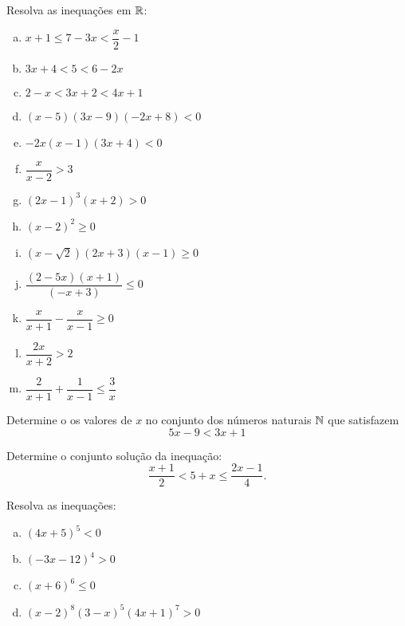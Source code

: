 \begin{secExercicios}

\begin{exer}
   Resolva as inequações em $\mathbb{R}$:
    \begin{enumerate}[a)]
        \item $x + 1 \leq 7 - 3x < \dfrac{x}{2}-1$
        \item $3x+4 < 5 < 6-2x$
        \item $2-x<3x+2<4x+1$
        \item $(x-5)(3x-9)(-2x+8)<0$
        \item $-2x(x-1)(3x+4)<0$
        \item $\dfrac{x}{x-2}>3$
        \item $(2x-1)^3(x+2)>0$
        \item $(x-2)^2 \geq 0$
        \item $(x-\sqrt{2})(2x+3)(x-1)\geq0$
        \item $\dfrac{(2-5x)(x+1)}{(-x+3)}\leq 0$
        \item $\dfrac{x}{x+1} - \dfrac{x}{x-1} \geq 0$
        \item $\dfrac{2x}{x+2} > 2$
        \item $\dfrac{2}{x+1} + \dfrac{1}{x-1} \leq \dfrac{3}{x}$
    \end{enumerate}
\end{exer}

\begin{exer}
    Determine o os valores de $x$ no conjunto dos números naturais $\mathbb{N}$ que satisfazem
    \begin{equation*}
        5x-9<3x+1
    \end{equation*}
\end{exer}


\begin{exer}
    Determine o conjunto solução da inequação:
    \begin{equation*}
        \frac{x+1}{2}<5+x\leq \frac{2x-1}{4}.
    \end{equation*}
\end{exer}

\begin{exer}
    Resolva as inequações:
    \begin{enumerate}[a)]
        \item $(4x+5)^5<0$
        \item $(-3x-12)^4>0$
        \item $(x+6)^6\leq 0$
        \item $(x-2)^8(3-x)^5(4x+1)^7>0$
    \end{enumerate}
\end{exer}


\end{secExercicios}
